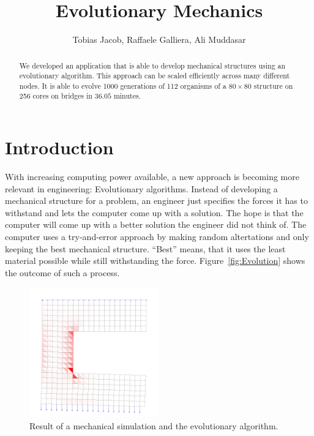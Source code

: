 \documentclass[12pt]{article}
\title{Evolutionary Mechanics}
\author{Tobias Jacob, Raffaele Galliera, Ali Muddasar}
\begin{document}
\maketitle

\begin{abstract}
    We developed an application that is able to develop mechanical structures using an evolutionary algorithm. This approach can be scaled efficiently across many different nodes. It is able to evolve 1000 generations of 112 organisms of a $80 \times 80$ structure on 256 cores on bridges in $36.05$ minutes.
\end{abstract}

\section{Introduction}

With increasing computing power available, a new approach is becoming more relevant in engineering: Evolutionary algorithms. Instead of developing a mechanical structure for a problem, an engineer just specifies the forces it has to withstand and lets the computer come up with a solution. The hope is that the computer will come up with a better solution the engineer did not think of. The computer uses a try-and-error approach by making random altertations and only keeping the best mechanical structure. ``Best'' means, that it uses the least material possible while still withstanding the force. Figure~\ref{fig:Evolution} shows the outcome of such a process.

\begin{figure}[h]
    \centering
    \includegraphics[width=0.5\textwidth, trim={0pt 0pt 0pt 5em}, clip]{images/MechaincalStructure.png}
    \caption{Result of a mechanical simulation and the evolutionary algorithm.}
    \label{fig:Mechanical_Simulation}
\end{figure}
\end{document}
